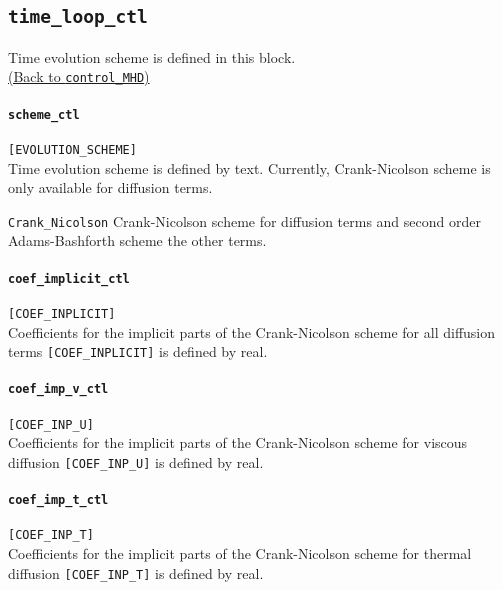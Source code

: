 \subsection{\tt time\_loop\_ctl}
\label{href_t:time_loop_ctl}
Time evolution scheme is defined in this block. \\
\hyperref[href_i:time_loop_ctl]{(Back to {\tt control\_MHD})}

\paragraph{\tt scheme\_ctl}
\label{href_t:scheme_ctl}
\verb|[EVOLUTION_SCHEME]| \\
Time evolution scheme is defined by text. Currently, Crank-Nicolson scheme is only available for diffusion terms.
%
\begin{description}
\item{\tt Crank\_Nicolson} Crank-Nicolson scheme for diffusion terms and second order Adams-Bashforth scheme the other terms.
\end{description}
%

\paragraph{\tt coef\_implicit\_ctl}
\label{href_t:coef_implicit_ctl}
\verb|[COEF_INPLICIT]| \\
Coefficients for the implicit parts of the Crank-Nicolson scheme for all diffusion terms  \verb|[COEF_INPLICIT]| is defined by real.

\paragraph{\tt coef\_imp\_v\_ctl}
\label{href_t:coef_imp_v_ctl}
\verb|[COEF_INP_U]| \\
Coefficients for the implicit parts of the Crank-Nicolson scheme for viscous diffusion \verb|[COEF_INP_U]| is defined by real.

\paragraph{\tt coef\_imp\_t\_ctl}
\label{href_t:coef_imp_t_ctl}
\verb|[COEF_INP_T]| \\
Coefficients for the implicit parts of the Crank-Nicolson scheme for thermal diffusion \verb|[COEF_INP_T]| is defined by real.

